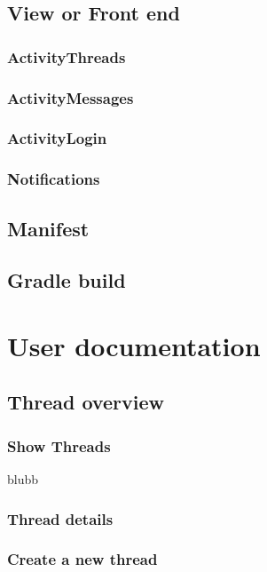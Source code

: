 \documentclass[12pt,a4paper,oneside]{report}
\begin{document}
\section{View or Front end}

\subsection{ActivityThreads}

\subsection{ActivityMessages}

\subsection{ActivityLogin}

\subsection{Notifications}

\section{Manifest}

\section{Gradle build}

\chapter{User documentation}

\section{Thread overview}

\subsection{Show Threads}
blubb
\subsection{Thread details}

\subsection{Create a new thread}
\end{document}
